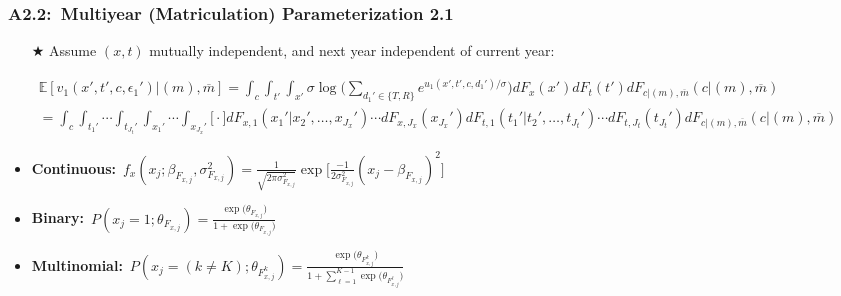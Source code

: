 \documentclass[12pt, aspectratio=169]{beamer}
\begin{document}
\begin{frame}[label=mmp21]
\frametitle{A2.2:\ Multiyear (Matriculation) Parameterization 2.1}
\begin{itemize}
\item[$\bigstar$] Assume $(x,t)$ mutually independent, and next year independent of current year:
\end{itemize}
\scriptsize
\begin{multline*}
\mathbb{E}[v_1(x',t',c,{\epsilon_1}')|(m),\overline{m}] = \int_c\int_{t'}\int_{x'}\sigma\log\bigg(\sum_{{d_1}'\in\{T,R\}}e^{u_1(x',t',c,{d_1}')/\sigma}\bigg)dF_x(x')dF_t(t')dF_{c|(m),\overline{m}}(c|(m),\overline{m}) \\
\!\!\!\!\!\!\!\!\!= \int_c\int_{{t_1}'}\cdots\int_{{t_{J_t}}'}\int_{{x_1}'}\cdots\int_{{x_{J_x}}'}\bigg[\cdot\bigg]dF_{x,1}({x_1}'|{x_2}',\dots,{x_{J_x}}')\cdots dF_{x,{J_x}}({x_{J_x}}')dF_{t,1}({t_1}'|{t_2}',\dots,{t_{J_t}}')\cdots dF_{t,{J_t}}({t_{J_t}}')dF_{c|(m),\overline{m}}(c|(m),\overline{m})
\end{multline*}
\normalsize
\begin{itemize}
\item \textbf{Continuous:}\ $f_x(x_j;\beta_{F_{x,j}},\sigma^2_{F_{x,j}}) = \frac{1}{\sqrt{2\pi\sigma^2_{F_{x,j}}}}\exp\Big[\frac{-1}{2\sigma^2_{F_{x,j}}}(x_j-\beta_{F_{x,j}})^2\Big]$
\item \textbf{Binary:}\ $P(x_j=1;\theta_{F_{x,j}}) = \frac{\exp\big(\theta_{F_{x,j}}\big)}{1+\exp\big(\theta_{F_{x,j}}\big)}$
\item \textbf{Multinomial:}\ $P(x_j=(k\neq K);\theta_{F_{x,j}^k}) = \frac{\exp\Big(\theta_{F_{x,j}^k}\Big)}{1+\sum_{\ell=1}^{K-1}\exp\Big(\theta_{F_{x,j}^\ell}\Big)}$
\end{itemize}
\hyperlink{conc}{}
\end{frame}
\end{document}
